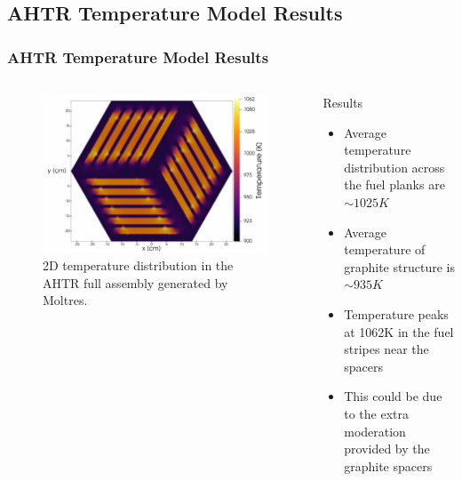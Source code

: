 \subsection{AHTR Temperature Model Results}
\begin{frame}
    \frametitle{AHTR Temperature Model Results}
    \begin{columns}
        \begin{column}{0.6\textwidth}
            \begin{figure}[]
                \centering
                \includegraphics[width=\linewidth]{../docs/figures/benchmark-temperature-model.png} 
                \caption{2D temperature distribution in the \acrfull{AHTR}
                full assembly generated by Moltres.}
            \end{figure}
        \end{column}
        \begin{column}{0.4\textwidth} 
            \begin{block}{Results}
                \begin{itemize}
                    \item Average temperature distribution across the fuel planks are 
                    $\sim 1025K$
                    \item Average temperature of graphite structure is $\sim 935K$
                    \item Temperature peaks at 1062K in the fuel stripes near the spacers
                    \item This could be due to the extra moderation provided by the
                    graphite spacers
                \end{itemize}
            \end{block}
        \end{column}
        \end{columns}
\end{frame}

